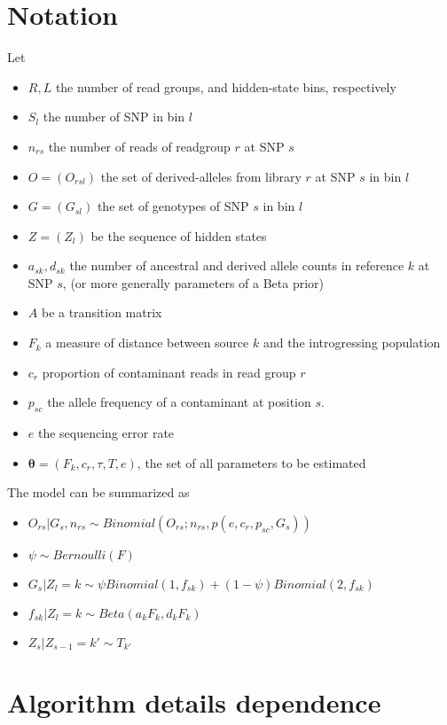 \documentclass[10pt,a4paper]{article}
\begin{document}
\section*{Notation}
	Let 
	\begin{itemize}
		\item $R, L$ the number of read groups, and hidden-state bins, respectively
		\item $S_l$ the number of SNP in bin $l$
		\item $n_{rs}$ the number of reads of readgroup $r$ at SNP $s$
		\item $O = (O_{rsl})$ the set of derived-alleles from library $r$ at SNP $s$ in bin $l$
		\item $G = (G_{sl})$ the set of genotypes of SNP $s$ in bin $l$
		\item $Z = (Z_l)$ be the sequence of hidden states
		\item $a_{sk}, d_{sk}$ the number of ancestral and derived allele counts in reference $k$ at SNP $s$, (or more generally parameters of a Beta prior)
		\item $A$ be a transition matrix		
		\item $F_k$ a measure of distance between source $k$ and the introgressing population
		\item $c_r$ proportion of contaminant reads in read group $r$
		\item $p_{sc}$ the allele frequency of a contaminant at position $s$. 
		\item $e$ the sequencing error rate
		\item $\mathbf{\theta} = (F_k, c_r, \tau, T, e)$, the set of all parameters to be estimated
	\end{itemize}
The model can be summarized as
	\begin{itemize}
		\item $O_{rs} | G_{s}, n_{rs} \sim Binomial(O_{rs}; n_{rs}, p(e, c_r, p_{sc}, G_{s}))$
		\item $\psi \sim Bernoulli(F)$
		\item $G_s|Z_l=k \sim \psi Binomial(1, f_{sk}) + (1-\psi) Binomial(2, f_{sk})$
		\item $f_{sk} | Z_l=k \sim Beta(a_kF_k, d_kF_k)$
		\item $Z_s | Z_{s-1}= k' \sim T_{k'}$
	\end{itemize}
\section{Algorithm details dependence}
\end{document}
